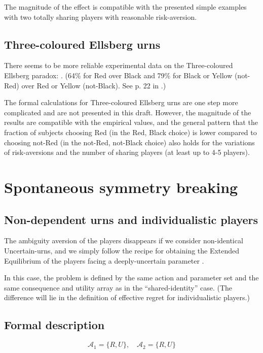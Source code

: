 \documentclass{article}
\theoremstyle{definition}
\begin{document}
The magnitude of the effect is compatible with the presented simple examples with two totally sharing players with reasonable risk-aversion.

\subsection{Three-coloured Ellsberg urns}

There seems to be more reliable experimental data on the Three-coloured Ellsberg paradox: \cite{paper:EmpiricalEllsberg}. (64\% for Red over Black and 79\% for Black or Yellow (not-Red) over Red or Yellow (not-Black). See p. 22 in \cite{paper:EmpiricalEllsberg}.)

The formal calculations for Three-coloured Ellsberg urns are one step more complicated and are not presented in this draft. However, the magnitude of the results are compatible with the empirical values, and the general pattern that the fraction of subjects choosing Red (in the Red, Black choice) is lower compared to choosing not-Red (in the not-Red, not-Black choice) also holds for the variations of risk-aversions and the number of sharing players (at least up to 4-5 players). 

\section{Spontaneous symmetry breaking}

\subsection{Non-dependent urns and individualistic players}

The ambiguity aversion of the players disappears if we consider non-identical Uncertain-urns, and we simply follow the recipe for obtaining the Extended Equilibrium of the players facing a deeply-uncertain parameter \cite{arxiv:ExtendedEquilibrium}.

In this case, the problem is defined by the same action and parameter set and the same consequence and utility array as in the ``shared-identity'' case. (The difference will lie in the definition of effective regret for individualistic players.)

\subsection{Formal description}

\begin{equation}
    \mathcal{A}_1 = \{ R, U \}, \quad
    \mathcal{A}_2 = \{ R, U \}
\end{equation}
\end{document}
